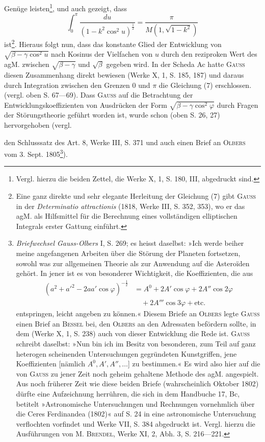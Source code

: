 \endgroup
\noindent Genüge leisten\footnote{Vergl. hierzu die beiden Zettel, die Werke X, 1, S. 180, III, abgedruckt sind.}, und auch gezeigt, dass
\begingroup\makeatletter\tagsleft@true\let\veqno\leqno\makeatother
\begin{equation*}
\int_0^\pi\frac{du}{(1-k^2\cos^2u)^{\frac12}}=\frac\pi{M(1,\sqrt{1-k^2})}\tag{7}
\end{equation*}
\endgroup
\noindent ist\footnote{Eine ganz direkte und sehr elegante Herleitung der Gleichung (7) gibt \textsc{Gauss} in der \textit{Determinatio attractionis} (1818, Werke III, S. 352, 353), wo er das agM. als Hilfsmittel für die Berechnung eines vollständigen elliptischen Integrals erster Gattung einführt.}. Hieraus folgt nun, dass das konstante Glied der Entwicklung von
\(\sqrt{\beta-\gamma\cos^2u}\) nach Kosinus der Vielfachen von \(u\) durch den reziproken Wert
des agM. zwischen \(\sqrt{\beta-\gamma}\) und \(\sqrt\beta\) gegeben wird. In der Scheda Ac hatte \textsc{Gauss}
diesen Zusammenhang direkt bewiesen (Werke X, 1, S. 185, 187) und daraus
durch Integration zwischen den Grenzen 0 und \(\pi\) die Gleichung (7) erschlossen.
(vergl. oben S. 67—69). Dass \textsc{Gauss} auf die Betrachtung der Entwicklungskoeffizienten
von Ausdrücken der Form \(\sqrt{\beta-\gamma\cos^2\varphi}\) durch Fragen der Störungstheorie
geführt worden ist, wurde schon (oben S. 26, 27) hervorgehoben (vergl.\par
\clearpage{}
\noindent den Schlusssatz des Art. 8, Werke III, S. 371 und auch einen Brief an \textsc{Olbers}
vom 3. Sept. 1805\footnote{\textit{Briefwechsel Gauss-Olbers} I, S. 269; es heisst daselbst: »Ich werde beiher meine angefangenen Arbeiten über die Störung der Planeten fortsetzen, sowohl was zur allgemeinen Theorie als zur Anwendung auf die Asteroïden gehört. In jener ist es von besonderer Wichtigkeit, die Koeffizienten, die aus
\[
\begin{aligned}
(a^2+a'^2-2aa'\cos\varphi)^{-\frac12}
&=A^0+2A'\cos\varphi+2A''\cos2\varphi\\
&\quad+2A'''\cos3\varphi+\mathrm{etc.}
\end{aligned}
\]
entspringen, leicht angeben zu können.« Diesem Briefe an \textsc{Olbers} legte \textsc{Gauss} einen Brief an \textsc{Bessel} bei, den \textsc{Olbers} an den Adressaten befördern sollte, in dem (Werke X, 1, S. 238) auch von dieser Entwicklung die Rede ist. \textsc{Gauss} schreibt daselbst: »Nun bin ich im Besitz von besonderen, zum Teil auf ganz heterogen scheinenden Untersuchungen gegründeten Kunstgriffen, jene Koeffizienten [nämlich \(A^0,A',A'',\ldots\)] zu bestimmen.« Es wird also hier auf die von \textsc{Gauss} zu jener Zeit noch geheim gehaltene Methode des agM. angespielt. Aus noch früherer Zeit wie diese beiden Briefe (wahrscheinlich Oktober 1802) dürfte eine Aufzeichnung herrühren, die sich in dem Handbuche 17, Bc, betitelt »Astronomische Untersuchungen und Rechnungen vornehmlich über die Ceres Ferdinandea (1802)« auf S. 24 in eine astronomische Untersuchung verflochten vorfindet und Werke VII, S. 384 abgedruckt ist. Vergl. hierzu die Ausführungen von M. \textsc{Brendel}, Werke XI, 2, Abh. 3, S. 216—221.}).

